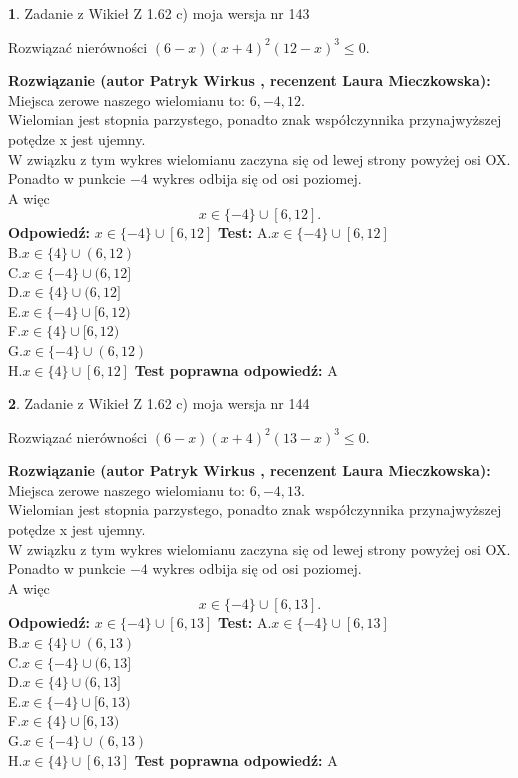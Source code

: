 \documentclass[12pt, a4paper]{article}
\theoremstyle{definition} %
\newtheorem{zad}{}
\newcommand{\zadStart}[1]{\begin{zad}#1\newline}
\newcommand{\zadStop}{\end{zad}}
\newcommand{\rozwStart}[2]{\noindent \textbf{Rozwiązanie (autor #1 , recenzent #2): }\newline}
\newcommand{\rozwStop}{\newline}
\newcommand{\odpStart}{\noindent \textbf{Odpowiedź:}\newline}
\newcommand{\odpStop}{\newline}
\newcommand{\testStart}{\noindent \textbf{Test:}\newline}
\newcommand{\testStop}{\newline}
\newcommand{\kluczStart}{\noindent \textbf{Test poprawna odpowiedź:}\newline}
\newcommand{\kluczStop}{\newline}
\begin{document}
\zadStart{Zadanie z Wikieł Z 1.62 c) moja wersja nr 143}

Rozwiązać nierówności $(6-x)(x+4)^{2}(12-x)^{3}\le0$.
\zadStop
\rozwStart{Patryk Wirkus}{Laura Mieczkowska}
Miejsca zerowe naszego wielomianu to: $6, -4, 12$.\\
Wielomian jest stopnia parzystego, ponadto znak współczynnika przy\linebreak najwyższej potędze x jest ujemny.\\ W związku z tym wykres wielomianu zaczyna się od lewej strony powyżej osi OX.\\
Ponadto w punkcie $-4$ wykres odbija się od osi poziomej.\\
A więc $$x \in \{-4\} \cup [6,12].$$
\rozwStop
\odpStart
$x \in \{-4\} \cup [6,12]$
\odpStop
\testStart
A.$x \in \{-4\} \cup [6,12]$\\
B.$x \in \{4\} \cup (6,12)$\\
C.$x \in \{-4\} \cup (6,12]$\\
D.$x \in \{4\} \cup (6,12]$\\
E.$x \in \{-4\} \cup [6,12)$\\
F.$x \in \{4\} \cup [6,12)$\\
G.$x \in \{-4\} \cup (6,12)$\\
H.$x \in \{4\} \cup [6,12]$
\testStop
\kluczStart
A
\kluczStop



\zadStart{Zadanie z Wikieł Z 1.62 c) moja wersja nr 144}

Rozwiązać nierówności $(6-x)(x+4)^{2}(13-x)^{3}\le0$.
\zadStop
\rozwStart{Patryk Wirkus}{Laura Mieczkowska}
Miejsca zerowe naszego wielomianu to: $6, -4, 13$.\\
Wielomian jest stopnia parzystego, ponadto znak współczynnika przy\linebreak najwyższej potędze x jest ujemny.\\ W związku z tym wykres wielomianu zaczyna się od lewej strony powyżej osi OX.\\
Ponadto w punkcie $-4$ wykres odbija się od osi poziomej.\\
A więc $$x \in \{-4\} \cup [6,13].$$
\rozwStop
\odpStart
$x \in \{-4\} \cup [6,13]$
\odpStop
\testStart
A.$x \in \{-4\} \cup [6,13]$\\
B.$x \in \{4\} \cup (6,13)$\\
C.$x \in \{-4\} \cup (6,13]$\\
D.$x \in \{4\} \cup (6,13]$\\
E.$x \in \{-4\} \cup [6,13)$\\
F.$x \in \{4\} \cup [6,13)$\\
G.$x \in \{-4\} \cup (6,13)$\\
H.$x \in \{4\} \cup [6,13]$
\testStop
\kluczStart
A
\kluczStop
\end{document}
